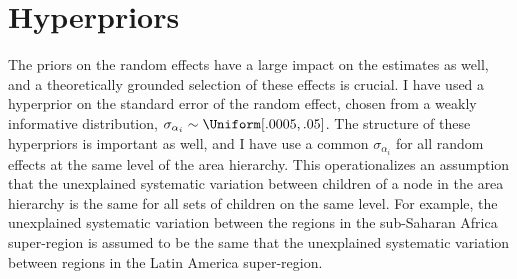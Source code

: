 \section{Hyperpriors}
The priors on the random effects have a large impact on the estimates
as well, and a theoretically grounded selection of these effects is
crucial.  I have used a hyperprior on the standard error of the random
effect, chosen from a weakly informative distribution, $\sigma_{\alpha_i}
\sim \Uniform[.0005, .05]$.  The structure of these hyperpriors is
important as well, and I have use a common $\sigma_{\alpha_i}$ for all
random effects at the same level of the area hierarchy.  This
operationalizes an assumption that the unexplained systematic variation between
children of a node in the area hierarchy is the same for all sets of
children on the same level.  For example, the unexplained systematic
variation between the regions in the sub-Saharan Africa super-region
is assumed to be the same that the unexplained systematic variation
between regions in the Latin America super-region.
